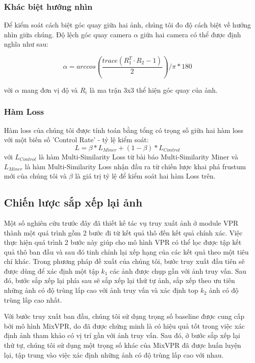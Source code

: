 \subsubsection*{Khác biệt hướng nhìn}

Để kiểm soát cách biệt góc quay giữa hai ảnh, chúng tôi đo độ cách biệt về hướng nhìn giữa chúng. Độ lệch góc quay camera $\alpha$ giữa hai camera có thể được định nghĩa như sau:

\begin{equation}
  \alpha = arccos\left(\frac{trace(R_1^T \cdot R_2 - 1)}{2} \right) / \pi * 180
\end{equation}

với $\alpha$ mang đơn vị độ và $R_i$ là ma trận 3x3 thể hiện góc quay của ảnh.

\subsubsection*{Hàm Loss}

Hàm loss của chúng tôi được tính toán bằng tổng có trọng số giữa hai hàm loss với một biến số 'Control Rate' - tỷ lệ kiểm soát:
\begin{equation}
  L = \beta * L_{Miner} + (1-\beta)*L_{Control}
\end{equation}
với $L_{Control}$ là hàm Multi-Similarity Loss từ bài báo Multi-Similarity Miner và $L_{Miner}$ là hàm Multi-Similarity Loss nhận đầu ra từ chiến lược khai phá frustum mới của chúng tôi và $\beta$ là giá trị tỷ lệ để kiểm soát hai hàm Loss trên.

\subsection{Chiến lược sắp xếp lại ảnh}
Một số nghiên cứu trước đây đã thiết kế tác vụ truy xuất ảnh ở module VPR thành một quá trình gồm 2 bước đi từ kết quả thô đến kết quả chính xác. Việc thực hiện quá trình 2 bước này giúp cho mô hình VPR có thể lọc được tập kết quả thô ban đầu và sau đó tinh chỉnh lại xếp hạng của các kết quả theo một tiêu chí khác. Trong phương pháp đề xuất của chúng tôi, bước truy xuất đầu tiên sẽ được dùng để xác định một tập $k_1$ các ảnh được chụp gần với ảnh truy vấn. Sau đó, bước sắp xếp lại phía sau sẽ sắp xếp lại thứ tự ảnh, sắp xếp theo ưu tiên những ảnh có độ trùng lấp cao với ảnh truy vấn và xác định top $k_2$ ảnh có độ trùng lấp cao nhất.

Với bước truy xuất ban đầu, chúng tôi sử dụng trọng số baseline được cung cấp bởi mô hình MixVPR, do đã được chứng minh là có hiệu quả tốt trong việc xác định ảnh tham khảo có vị trí gần với ảnh truy vấn. Sau đó, ở bước sắp xếp lại thứ tự, chúng tôi sử dụng một trọng số khác của MixVPR đã được huấn luyện lại, tập trung vào việc xác định những ảnh có độ trùng lấp cao với nhau.

